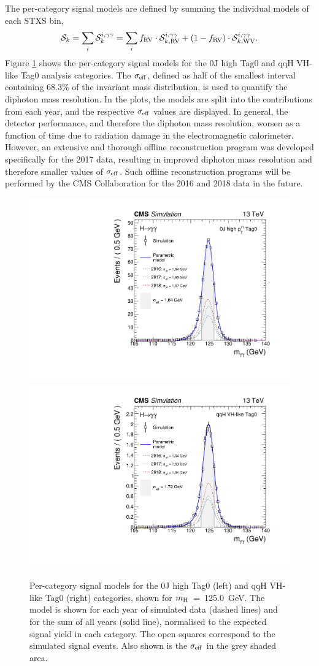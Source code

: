 The per-category signal models are defined by summing the individual models of each STXS bin,
\begin{equation}
    \mathcal{S}_k = \sum_i \mathcal{S}^{i,\gamma\gamma}_k = \sum_i f_{{\rm{RV}}} \cdot \mathcal{S}^{i,\gamma\gamma}_{k,{\rm{RV}}} + (1-f_{{\rm{RV}}}) \cdot\mathcal{S}^{i,\gamma\gamma}_{k,{\rm{WV}}}.
\end{equation}
\noindent
Figure \ref{fig:sigmodels_category} shows the per-category signal models for the 0J high \ptH Tag0 and qqH VH-like Tag0 analysis categories. The $\sigma_{\rm{eff}}$, defined as half of the smallest interval containing 68.3\% of the invariant mass distribution, is used to quantify the diphoton mass resolution. In the plots, the models are split into the contributions from each year, and the respective $\sigma_{\rm{eff}}$ values are displayed. In general, the detector performance, and therefore the diphoton mass resolution, worsen as a function of time due to radiation damage in the electromagnetic calorimeter. However, an extensive and thorough offline reconstruction program was developed specifically for the 2017 data, resulting in improved diphoton mass resolution and therefore smaller values of $\sigma_{\rm{eff}}$. Such offline reconstruction programs will be performed by the CMS Collaboration for the 2016 and 2018 data in the future. 

\begin{figure}
  \centering
  \includegraphics[width=.45\textwidth]{Figures/hgg_stats/smodel_RECO_0J_PTH_GT10_Tag0.pdf}
  \includegraphics[width=.45\textwidth]{Figures/hgg_stats/smodel_RECO_VBFTOPO_VHHAD_Tag0.pdf}
  \caption[Signal models for the 0J high \ptgg Tag0 and qqH VH-like Tag0 categories]
  {
    Per-category signal models for the 0J high \ptH Tag0 (left) and qqH VH-like Tag0 (right) categories, shown for $m_{\rm{H}}$~=~125.0~GeV. The model is shown for each year of simulated data (dashed lines) and for the sum of all years (solid line), normalised to the expected signal yield in each category. The open squares correspond to the simulated signal events. Also shown is the $\sigma_{\rm{eff}}$ in the grey shaded area. 
  }
  \label{fig:sigmodels_category}
\end{figure}


